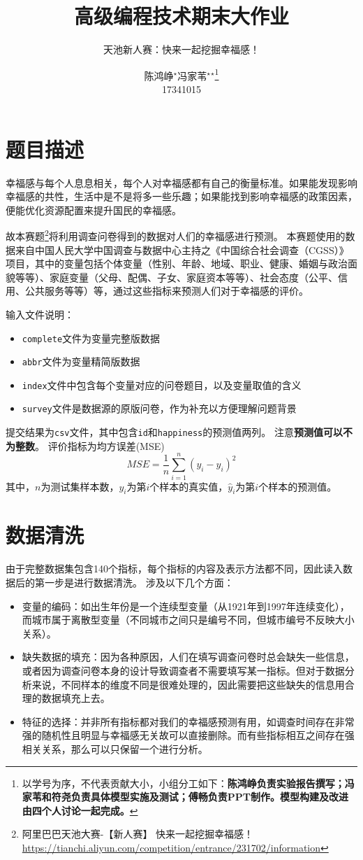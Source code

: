 \documentclass[logo,reportComp]{thesis}
\title{高级编程技术期末大作业}
\subtitle{天池新人赛：快来一起挖掘幸福感！}
\author{
陈鸿峥$^\star$\qquad\quad 冯家苇$^\star$\qquad\quad \makebox[3em][s]{符\hspace{\fill}尧}$^\star$\qquad\quad \makebox[3em][s]{傅\hspace{\fill}畅}\protect\footnote{以学号为序，不代表贡献大小，小组分工如下：\textbf{陈鸿峥负责实验报告撰写；冯家苇和符尧负责具体模型实施及测试；傅畅负责PPT制作。模型构建及改进由四个人讨论一起完成。}}\qquad\quad\\17341015\qquad 17341035\qquad 17341037\qquad 17341038}
\begin{document}
\maketitle

\section{题目描述}
幸福感与每个人息息相关，每个人对幸福感都有自己的衡量标准。如果能发现影响幸福感的共性，生活中是不是将多一些乐趣；如果能找到影响幸福感的政策因素，便能优化资源配置来提升国民的幸福感。

故本赛题\footnote{阿里巴巴天池大赛-【新人赛】 快来一起挖掘幸福感！\url{https://tianchi.aliyun.com/competition/entrance/231702/information}}将利用调查问卷得到的数据对人们的幸福感进行预测。
本赛题使用的数据来自中国人民大学中国调查与数据中心主持之《中国综合社会调查（CGSS）》项目，其中的变量包括个体变量（性别、年龄、地域、职业、健康、婚姻与政治面貌等等）、家庭变量（父母、配偶、子女、家庭资本等等）、社会态度（公平、信用、公共服务等等）等，通过这些指标来预测人们对于幸福感的评价。

输入文件说明：
\begin{itemize}
	\item \verb'complete'文件为变量完整版数据
	\item \verb'abbr'文件为变量精简版数据
	\item \verb'index'文件中包含每个变量对应的问卷题目，以及变量取值的含义
	\item \verb'survey'文件是数据源的原版问卷，作为补充以方便理解问题背景
\end{itemize}

提交结果为\verb'csv'文件，其中包含\verb'id'和\verb'happiness'的预测值两列。
注意\textbf{预测值可以不为整数}。
评价指标为均方误差(MSE)
\[MSE=\frac{1}{n}\sum_{i=1}^n(y_i-\hat{y}_i)^2\]
其中，$n$为测试集样本数，$y_i$为第$i$个样本的真实值，$\hat{y}_i$为第$i$个样本的预测值。

\section{数据清洗}
由于完整数据集包含140个指标，每个指标的内容及表示方法都不同，因此读入数据后的第一步是进行数据清洗。
涉及以下几个方面：
\begin{itemize}
	\item 变量的编码：如出生年份是一个连续型变量（从1921年到1997年连续变化），而城市属于离散型变量（不同城市之间只是编号不同，但城市编号不反映大小关系）。
	\item 缺失数据的填充：因为各种原因，人们在填写调查问卷时总会缺失一些信息，或者因为调查问卷本身的设计导致调查者不需要填写某一指标。但对于数据分析来说，不同样本的维度不同是很难处理的，因此需要把这些缺失的信息用合理的数据填充上去。
	\item 特征的选择：并非所有指标都对我们的幸福感预测有用，如调查时间存在非常强的随机性且明显与幸福感无关故可以直接删除。而有些指标相互之间存在强相关关系，那么可以只保留一个进行分析。
\end{itemize}
\end{document}
